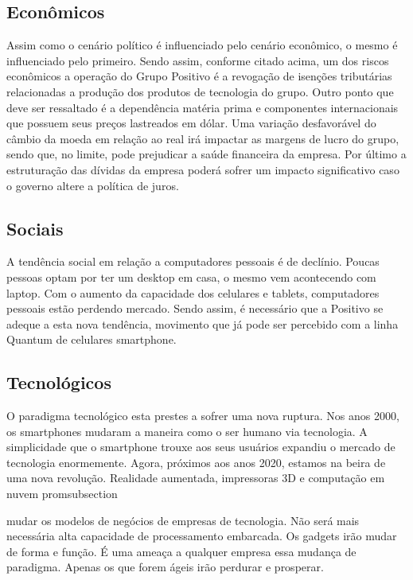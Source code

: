 {{{\subsection{Econômicos}

Assim como o cenário político é influenciado pelo cenário econômico, o mesmo é influenciado pelo primeiro. Sendo assim, conforme citado acima, um dos riscos econômicos a operação do Grupo Positivo é a revogação de isenções tributárias relacionadas a produção dos produtos de tecnologia do grupo. Outro ponto que deve ser ressaltado é a dependência matéria prima e componentes internacionais que possuem seus preços lastreados em dólar. Uma variação desfavorável do câmbio da moeda em relação ao real irá impactar as margens de lucro do grupo, sendo que, no limite, pode prejudicar a saúde financeira da empresa.
Por último a estruturação das dívidas da empresa poderá sofrer um impacto significativo caso o governo altere a política de juros.

\subsection{Sociais}
A tendência social em relação a computadores pessoais é de declínio. Poucas pessoas optam por ter um desktop em casa, o mesmo vem acontecendo com laptop. Com o aumento da capacidade dos celulares e tablets, computadores pessoais estão perdendo mercado. Sendo assim, é necessário que a Positivo se adeque a esta nova tendência, movimento que já pode ser percebido com a linha Quantum de celulares smartphone.

\subsection{Tecnológicos}
O paradigma tecnológico esta prestes a sofrer uma nova ruptura. Nos anos 2000, os smartphones mudaram a maneira como o ser humano via tecnologia. A simplicidade que o smartphone trouxe aos seus usuários expandiu o mercado de tecnologia enormemente. Agora, próximos aos anos 2020, estamos na beira de uma nova revolução. Realidade aumentada, impressoras 3D e computação em nuvem promsubsection{ mudar os modelos de negócios de empresas de tecnologia. Não será mais necessária alta capacidade de processamento embarcada. Os gadgets irão mudar de forma e função. É uma ameaça a qualquer empresa essa mudança de paradigma. Apenas os que forem ágeis irão perdurar e prosperar.

}}}}
